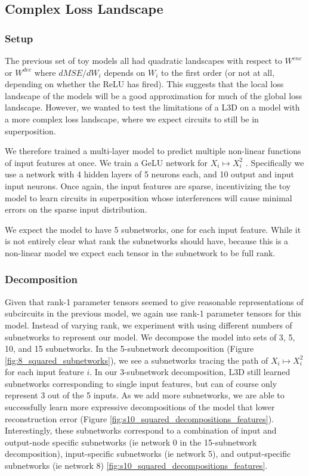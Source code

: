 \documentclass{article}
\theoremstyle{plain}
\theoremstyle{definition}
\theoremstyle{remark}
\begin{document}
\subsection{Complex Loss Landscape}


\subsubsection{Setup}


The previous set of toy models all had quadratic landscapes with respect to $W^{enc}$ or $W^{dec}$ where $dMSE/dW_i$ depends on $W_i$ to the first order (or not at all, depending on whether the ReLU has fired). This suggests that the local loss landscape of the models will be a good approximation for much of the global loss landscape. However, we wanted to test the limitations of a L3D on a model with a more complex loss landscape, where we expect circuits to still be in superposition. 

We therefore trained a multi-layer model to predict multiple non-linear functions of input features at once. We train a GeLU network for $X_i \mapsto X_i^2$ . Specifically we use a network with 4 hidden layers of 5 neurons each, and 10 output and input input neurons. Once again, the input features are sparse, incentivizing the toy model to learn circuits in superposition whose interferences will cause minimal errors on the sparse input distribution. 

We expect the model to have 5 subnetworks, one for each input feature. While it is not entirely clear what rank the subnetworks should have, because this is a non-linear model we expect each tensor in the subnetwork to be full rank.

\subsubsection{Decomposition}

Given that rank-1 parameter tensors seemed to give reasonable representations of subcircuits in the previous model, we again use rank-1 parameter tensors for this model. Instead of varying rank, we experiment with using different numbers of subnetworks to represent our model. We decompose the model into sets of 3, 5, 10, and 15 subnetworks. In the 5-subnetwork decomposition (Figure \ref{fig:8_squared_subnetworks}), we see a subnetworks tracing the path of $X_i \mapsto X_i^2$ for each input feature $i$. In our 3-subnetwork decomposition, L3D still learned subnetworks corresponding to single input features, but can of course only represent 3 out of the 5 inputs. As we add more subnetworks, we are able to successfully learn more expressive decompositions of the model that lower reconstruction error (Figure \ref{fig:s10_squared_decompositions_features}). Interestingly, these subnetworks correspond to a combination of input and output-node specific subnetworks (ie network 0 in the 15-subnetwork decomposition), input-specific subnetworks (ie network 5), and output-specific subnetworks (ie network 8) \ref{fig:s10_squared_decompositions_features}.
\end{document}
